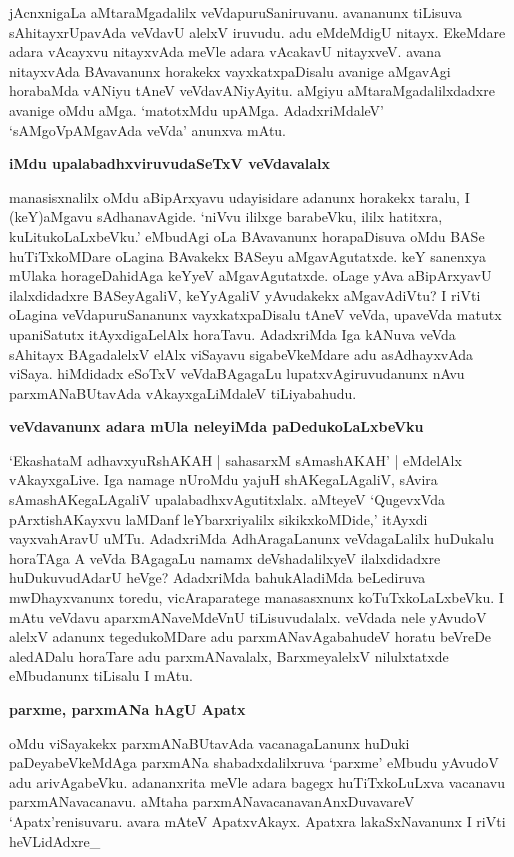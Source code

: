 jAcnxnigaLa aMtaraMga\-dalilx veVda\-puruSaniruvanu. avananunx tiLisuva sAhitayxrUpavAda veVdavU alelxV iruvudu. adu eMdeM\-digU nitayx. EkeMdare adara vAcayxvu nitayxvAda meVle adara vAcakavU nitayxveV. avana nitayxvAda BAva\-vanunx \-horakekx vayxkatx\-paDi\-salu avanige aMgavAgi horabaMda vANiyu tAneV veVdavANiyAyitu. aMgiyu aMtaraMga\-dalilxdadxre avanige oMdu aMga. `matotxMdu upAMga. AdadxriMdaleV' `sAMgoV\-pAMgavAda veVda' anunxva mAtu.

{\bigskip
\noindent
{\large\bf iMdu upalabadhxviruvudaSeTxV veVdavalalx}}\label{page134}
\medskip

\noindent
manasisxnalilx oMdu aBipArxyavu udayisidare adanunx horakekx taralu, I (keY)aMgavu sAdhana\-vAgide. `niVvu ililxge barabeVku, ililx hatitxra, kuLitukoLaLxbeVku.' eMbudAgi oLa BAvavanunx hora\-paDisuva oMdu BASe huTiTxkoMDare oLagina BAvakekx BASeyu aMgavAgutatxde. keY sanenxya mUlaka\- horageDahidAga keYyeV aMgavAgutatxde. oLage yAva aBipArxyavU ilalxdidadxre BASe\-yAgaliV, keYyA\-galiV yAvudakekx aMgavAdiVtu? I riVti oLagina veVdapuruSananunx vayxkatxpaDisalu tAneV veVda, upa\-veVda matutx upaniSatutx itAyxdigaLelAlx horaTavu. AdadxriMda Iga kANuva veVda sAhitayx BAga\-dalelxV elAlx viSayavu sigabeVkeMdare adu asAdhayxvAda viSaya. hiMdidadx eSoTxV veVdaBAgagaLu lupatx\-vAgiru\-vudanunx nAvu parxmANaBUtavAda vAkayxgaLiMdaleV tiLiyabahudu.

{\bigskip
\noindent
{\large\bf veVdavanunx adara mUla neleyiMda paDedukoLaLxbeVku}}\label{page135}
\medskip

\noindent
`EkashataM adhavxyuRshAKAH | sahasarxM sAmashAKAH' |\label{135} eMdelAlx vAkayxgaLive. Iga namage nUroMdu yajuH shAKegaLAgaliV, sAvira sAmashAKegaLAgaliV upalabadhxvAgutitxlalx. aMteyeV `QugevxVda pArxti\-shAKayxvu laMDanf leYbarxriyalilx sikikxkoMDide,' itAyxdi vayxvahAravU uMTu. AdadxriMda AdhAra\-gaLanunx veVdagaLalilx huDukalu horaTAga A veVda BAgagaLu namamx deVshadalilxyeV ilalxdidadxre huDukuvu\-dAdarU heVge? AdadxriMda bahukAladiMda beLediruva mwDhayxvanunx toredu, vicAraparatege manasasxnunx koTuTx\-koLaLx\-beVku. I mAtu veVdavu aparxmANaveMdeVnU tiLisuvudalalx. veVdada nele yAvudoV alelxV adanunx tegedukoMDare adu parxmANavAgabahudeV horatu beVreDe aledADalu horaTare adu parx\-mANa\-valalx, BarxmeyalelxV nilulxtatxde eMbudanunx tiLisalu I mAtu.

{\bigskip
\noindent
{\large\bf parxme, parxmANa hAgU Apatx}}\label{page135}
\medskip

\noindent
oMdu viSayakekx parxmANaBUtavAda vacanagaLanunx huDuki paDeyabeVkeMdAga parxmANa shabadx\-dalilx\-ruva `parxme' eMbudu yAvudoV adu arivAgabeVku. adananxrita meVle adara bagegx huTiTxkoLuLxva vaca\-navu parxmANavacanavu. aMtaha parxmANavacanavanAnxDuvavareV `Apatx'renisuvaru. avara mAteV Apatx\-vAkayx. Apatxra lakaSxNavanunx I riVti heVLidAdxre\_

